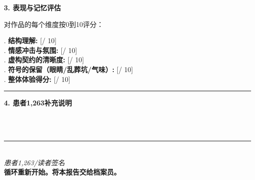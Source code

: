 \noindent\textbf{3. 表现与记忆评估}

\vspace{0.4em}
\noindent 对作品的每个维度按0到10评分：

\vspace{0.3em}
. \textbf{结构理解:} [\qquad / 10]\\[0.25em]
. \textbf{情感冲击与氛围:} [\qquad / 10]\\[0.25em]
. \textbf{虚构契约的清晰度:} [\qquad / 10]\\[0.25em]
. \textbf{符号的保留（眼睛/乱葬坑/气味）:} [\qquad / 10]\\[0.25em]
. \textbf{整体体验得分:} [\qquad / 10]

\vspace{1em}
\noindent\rule{\textwidth}{0.5pt}
\vspace{0.5em}

\noindent\textbf{4. 患者1,263补充说明}

\vspace{0.5em}
\noindent\dotfill\\[0.4em]
\noindent\dotfill\\[0.4em]
\noindent\dotfill

\vspace{1.5em}
\begin{center}
\rule{0.5\textwidth}{0.5pt}\\[0.4em]
\textit{患者1,263/读者签名}\\[0.3em]
{\small\textcolor{sangue}{\textbf{循环重新开始。将本报告交给档案员。}}}
\end{center}

\endgroup
\clearpage
